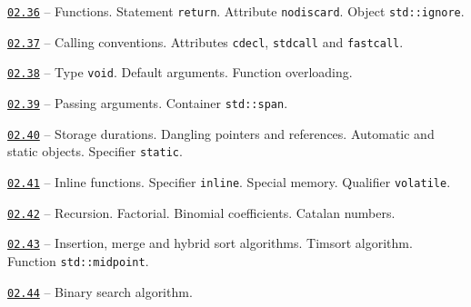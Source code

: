 \documentclass[a4paper,12pt]{article}
\renewenvironment{itemize}
{
    \begin{list}{\labelitemi}
    {
      \setlength{\topsep}{0pt}
      \setlength{\partopsep}{0pt}
      \setlength{\parskip}{0pt}
      \setlength{\itemsep}{0pt}
      \setlength{\parsep}{0pt}
      \setlength{\leftmargin}{14.5pt}
    }
}{\end{list}}
\begin{document}
\begin{itemize}

    \item \href{https://github.com/i-s-m-mipt/Education/blob/master/projects/examples/source/02.36.cpp}{\texttt{02.36}} -- Functions. Statement \lstinline{return}. Attribute \lstinline{nodiscard}. Object \lstinline{std::ignore}.

    \smallskip

    \item \href{https://github.com/i-s-m-mipt/Education/blob/master/projects/examples/source/02.37.cpp}{\texttt{02.37}} -- Calling conventions. Attributes \lstinline{cdecl}, \lstinline{stdcall} and \lstinline{fastcall}.

    \smallskip

    \item \href{https://github.com/i-s-m-mipt/Education/blob/master/projects/examples/source/02.38.cpp}{\texttt{02.38}} -- Type \lstinline{void}. Default arguments. Function overloading.

    \smallskip

    \item \href{https://github.com/i-s-m-mipt/Education/blob/master/projects/examples/source/02.39.cpp}{\texttt{02.39}} -- Passing arguments. Container \lstinline{std::span}.

    \smallskip

    \item \href{https://github.com/i-s-m-mipt/Education/blob/master/projects/examples/source/02.40.cpp}{\texttt{02.40}} -- Storage durations. Dangling pointers and references. Automatic and static objects. Specifier \lstinline{static}.

    \smallskip
    
    \item \href{https://github.com/i-s-m-mipt/Education/blob/master/projects/examples/source/02.41.cpp}{\texttt{02.41}} -- Inline functions. Specifier \lstinline{inline}. Special memory. Qualifier \lstinline{volatile}.

    \smallskip

    \item \href{https://github.com/i-s-m-mipt/Education/blob/master/projects/examples/source/02.42.cpp}{\texttt{02.42}} -- Recursion. Factorial. Binomial coefficients. Catalan numbers.

    \smallskip

    \item \href{https://github.com/i-s-m-mipt/Education/blob/master/projects/examples/source/02.43.cpp}{\texttt{02.43}} -- Insertion, merge and hybrid sort algorithms. Timsort algorithm. Function \lstinline{std::midpoint}.

    \smallskip

    \item \href{https://github.com/i-s-m-mipt/Education/blob/master/projects/examples/source/02.44.cpp}{\texttt{02.44}} -- Binary search algorithm.

\end{itemize}
\end{document}
